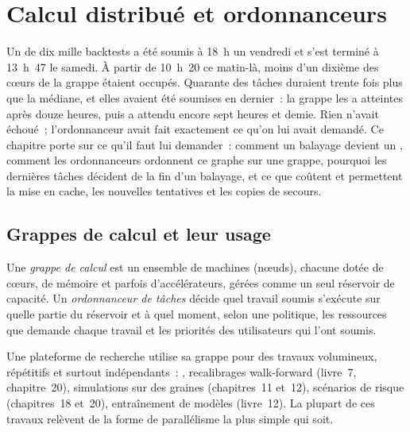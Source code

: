 \chapter{Calcul distribué et ordonnanceurs}\label{ch:pl:distributed-compute-and-schedulers}

Un  de dix mille backtests a été soumis à 18~h un vendredi et s'est terminé à 13~h~47 le samedi. À partir de 10~h~20 ce matin-là,
moins d'un dixième des cœurs de la grappe étaient occupés. Quarante des tâches duraient trente fois plus que la médiane, et elles avaient
été soumises en dernier~: la grappe les a atteintes après douze heures, puis a attendu encore sept heures et demie. Rien n'avait échoué~; l'ordonnanceur avait fait
exactement ce qu'on lui avait demandé. Ce chapitre porte sur ce qu'il faut lui demander~: comment un balayage devient un , comment les ordonnanceurs ordonnent ce graphe sur
une grappe, pourquoi les dernières tâches décident de la fin d'un balayage, et ce que coûtent et permettent la mise en cache, les nouvelles tentatives et les copies de secours.

\section{Grappes de calcul et leur usage}

\begin{definition}\label{def:pl:distributed-compute-and-schedulers:cluster}
Une \emph{grappe de calcul} est un ensemble de machines (nœuds), chacune dotée de cœurs, de mémoire et parfois d'accélérateurs, gérées
comme un seul réservoir de capacité. Un \emph{ordonnanceur de tâches} décide quel travail soumis s'exécute sur quelle partie du réservoir et à quel moment,
selon une politique, les ressources que demande chaque travail et les priorités des utilisateurs qui l'ont soumis.
\end{definition}

Une plateforme de recherche utilise sa grappe pour des travaux volumineux, répétitifs et surtout indépendants~: , recalibrages walk-forward
(livre~7, chapitre~20), simulations sur des graines (chapitres~11 et~12), scénarios de risque (chapitres~18 et~20), entraînement de modèles (livre~12). La plupart de ces travaux
relèvent de la forme de parallélisme la plus simple qui soit.


